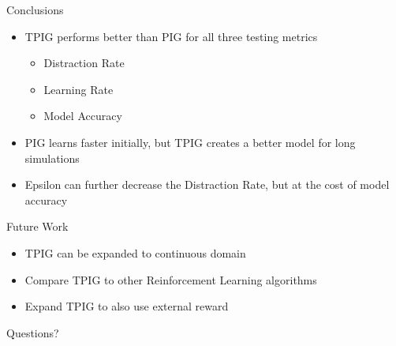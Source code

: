 	\begin{frame}[fragile]{Conclusions}
		\begin{itemize}
			\item {TPIG performs better than PIG for all three testing metrics}
			\begin{itemize}
				\item {Distraction Rate}
				\item {Learning Rate}
				\item {Model Accuracy}
			\end{itemize}
			\item {PIG learns faster initially, but TPIG creates a better model for long simulations}
			\item {Epsilon can further decrease the Distraction Rate, but at the cost of model accuracy}
		\end{itemize}
	\end{frame}
	
	\begin{frame}[fragile]{Future Work}
		\begin{itemize}
			\item {TPIG can be expanded to continuous domain}
			\item {Compare TPIG to other Reinforcement Learning algorithms}
			\item {Expand TPIG to also use external reward}
		\end{itemize}
	\end{frame}
	
	
	\begin{frame}[fragile]{Questions?}
	\end{frame}
	
	
	
	
							
